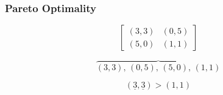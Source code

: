 \begin{frame}
    \frametitle{Pareto Optimality}
    
    \centering
    \begin{equation*}
        \begin{bmatrix}
            (3,3) & (0,5) \\
            (5,0) & (1,1)
        \end{bmatrix}
    \end{equation*}

    \vspace{-0.5cm}
    \begin{equation*}
        \overbrace{(3,3), \, (0,5), \, (5,0), \, (1,1)}
    \end{equation*}

    \begin{equation*}
        (\underline{3},\underline{3}) > (1,1)
    \end{equation*}
\end{frame}
